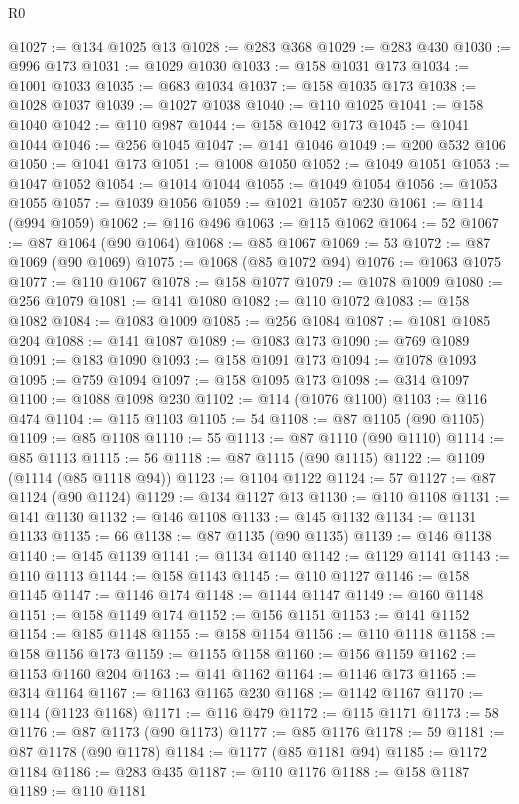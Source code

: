 \begin{lexlean}{R0}
\begin{coremodule}
@1027 := @134 @1025 @13
@1028 := @283 @368
@1029 := @283 @430
@1030 := @996 @173
@1031 := @1029 @1030
@1033 := @158 @1031 @173
@1034 := @1001 @1033
@1035 := @683 @1034
@1037 := @158 @1035 @173
@1038 := @1028 @1037
@1039 := @1027 @1038
@1040 := @110 @1025
@1041 := @158 @1040
@1042 := @110 @987
@1044 := @158 @1042 @173
@1045 := @1041 @1044
@1046 := @256 @1045
@1047 := @141 @1046
@1049 := @200 @532 @106
@1050 := @1041 @173
@1051 := @1008 @1050
@1052 := @1049 @1051
@1053 := @1047 @1052
@1054 := @1014 @1044
@1055 := @1049 @1054
@1056 := @1053 @1055
@1057 := @1039 @1056
@1059 := @1021 @1057 @230
@1061 := @114 (@994 @1059)
@1062 := @116 @496
@1063 := @115 @1062
@1064 := 52
@1067 := @87 @1064 (@90 @1064)
@1068 := @85 @1067
@1069 := 53
@1072 := @87 @1069 (@90 @1069)
@1075 := @1068 (@85 @1072 @94)
@1076 := @1063 @1075
@1077 := @110 @1067
@1078 := @158 @1077
@1079 := @1078 @1009
@1080 := @256 @1079
@1081 := @141 @1080
@1082 := @110 @1072
@1083 := @158 @1082
@1084 := @1083 @1009
@1085 := @256 @1084
@1087 := @1081 @1085 @204
@1088 := @141 @1087
@1089 := @1083 @173
@1090 := @769 @1089
@1091 := @183 @1090
@1093 := @158 @1091 @173
@1094 := @1078 @1093
@1095 := @759 @1094
@1097 := @158 @1095 @173
@1098 := @314 @1097
@1100 := @1088 @1098 @230
@1102 := @114 (@1076 @1100)
@1103 := @116 @474
@1104 := @115 @1103
@1105 := 54
@1108 := @87 @1105 (@90 @1105)
@1109 := @85 @1108
@1110 := 55
@1113 := @87 @1110 (@90 @1110)
@1114 := @85 @1113
@1115 := 56
@1118 := @87 @1115 (@90 @1115)
@1122 := @1109 (@1114 (@85 @1118 @94))
@1123 := @1104 @1122
@1124 := 57
@1127 := @87 @1124 (@90 @1124)
@1129 := @134 @1127 @13
@1130 := @110 @1108
@1131 := @141 @1130
@1132 := @146 @1108
@1133 := @145 @1132
@1134 := @1131 @1133
@1135 := 66
@1138 := @87 @1135 (@90 @1135)
@1139 := @146 @1138
@1140 := @145 @1139
@1141 := @1134 @1140
@1142 := @1129 @1141
@1143 := @110 @1113
@1144 := @158 @1143
@1145 := @110 @1127
@1146 := @158 @1145
@1147 := @1146 @174
@1148 := @1144 @1147
@1149 := @160 @1148
@1151 := @158 @1149 @174
@1152 := @156 @1151
@1153 := @141 @1152
@1154 := @185 @1148
@1155 := @158 @1154
@1156 := @110 @1118
@1158 := @158 @1156 @173
@1159 := @1155 @1158
@1160 := @156 @1159
@1162 := @1153 @1160 @204
@1163 := @141 @1162
@1164 := @1146 @173
@1165 := @314 @1164
@1167 := @1163 @1165 @230
@1168 := @1142 @1167
@1170 := @114 (@1123 @1168)
@1171 := @116 @479
@1172 := @115 @1171
@1173 := 58
@1176 := @87 @1173 (@90 @1173)
@1177 := @85 @1176
@1178 := 59
@1181 := @87 @1178 (@90 @1178)
@1184 := @1177 (@85 @1181 @94)
@1185 := @1172 @1184
@1186 := @283 @435
@1187 := @110 @1176
@1188 := @158 @1187
@1189 := @110 @1181

\end{coremodule}
\end{lexlean}
